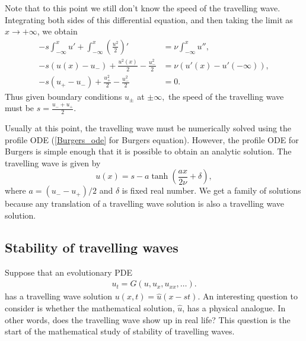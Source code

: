 Note that to this point we still don't know the speed of the travelling wave.  Integrating both sides of this differential equation, and then taking the limit as $x \to +\infty$, we obtain
\begin{align*}
-s\int_{-\infty}^x u' + \int_{-\infty}^x \left(\frac{u^2}{2}\right)' &= \nu \int_{-\infty}^x u'',\\	
-s(u(x) - u_-) + \frac{u^2(x)}{2} - \frac{u_-^2}{2} &= \nu (u'(x) - u'(-\infty)), \\
-s(u_+ - u_-) + \frac{u_+^2}{2} - \frac{u_-^2}{2} &= 0. 
\end{align*}
Thus given boundary conditions $u_{\pm}$ at $\pm \infty,$ the speed of the travelling wave must be $s = \frac{u_- + u_+}{2}.$ 

Usually at this point, the travelling wave must be numerically solved using the profile ODE (\eqref{Burgers_ode} for Burgers equation).  However, the profile ODE for Burgers is simple enough that it is possible to obtain an analytic solution. The travelling wave is  given by 
\[u(x) = s - a \tanh \left(\frac{ax }{2\nu} + \delta\right),\]
where $a = (u_- - u_+)/2$ and $\delta$ is fixed real number. We get a family of solutions because any translation of a travelling wave solution is also a travelling wave solution. 

\subsection*{Stability of travelling waves}
Suppose that an evolutionary PDE 
\begin{align}
u_t = G(u,u_x, u_{xx}, \ldots). \label{evol_pde_repeat}
\end{align} 
has a travelling wave solution $u(x,t) = \hat{u}(x-st)$.  An interesting question to consider is whether the mathematical solution, $\hat{u}$, has a physical analogue.  In other words, does the travelling wave show up in real life? This question is the start of the mathematical study of stability of travelling waves. 

